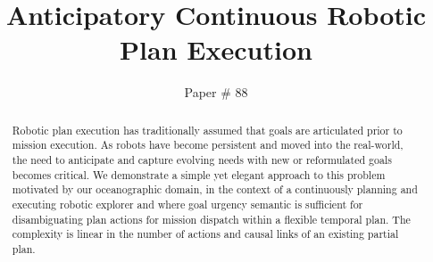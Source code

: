 \documentclass[letterpaper]{article}
\begin{document}
\title{Anticipatory Continuous Robotic Plan Execution}
\author{Paper \# 88}
\maketitle{}

\begin{abstract}

  Robotic plan execution has traditionally assumed that goals are
  articulated prior to mission execution. As robots have become
  persistent and moved into the real-world, the need to anticipate and
  capture evolving needs with new or reformulated goals becomes
  critical. We demonstrate a simple yet elegant approach to this
  problem motivated by our oceanographic domain, in the context of a
  continuously planning and executing robotic explorer and where
  goal urgency semantic is sufficient for disambiguating plan actions for
  mission dispatch within a flexible temporal plan. The complexity is 
  linear in the number of actions and causal links of an existing partial plan.
\end{abstract}






 






\twocolumn 


\end{document}

